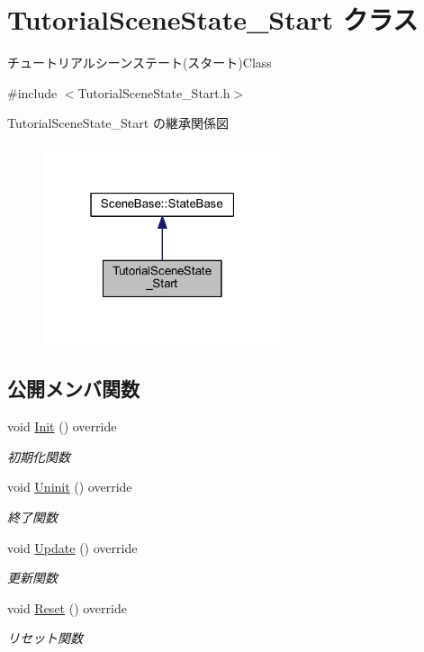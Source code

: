 \hypertarget{class_tutorial_scene_state___start}{}\section{Tutorial\+Scene\+State\+\_\+\+Start クラス}
\label{class_tutorial_scene_state___start}


チュートリアルシーンステート(スタート)Class  




{\ttfamily \#include $<$Tutorial\+Scene\+State\+\_\+\+Start.\+h$>$}



Tutorial\+Scene\+State\+\_\+\+Start の継承関係図\nopagebreak
\begin{figure}[H]
\begin{center}
\leavevmode
\includegraphics[width=199pt]{class_tutorial_scene_state___start__inherit__graph}
\end{center}
\end{figure}
\subsection*{公開メンバ関数}
\begin{DoxyCompactItemize}
\item 
void \mbox{\hyperlink{class_tutorial_scene_state___start_acd4cd7e4efeebffa9616d7ca31c7b1c0}{Init}} () override
\begin{DoxyCompactList}\small\item\em 初期化関数 \end{DoxyCompactList}\item 
void \mbox{\hyperlink{class_tutorial_scene_state___start_a974962addfb0bcba90fbab64ac6d50f0}{Uninit}} () override
\begin{DoxyCompactList}\small\item\em 終了関数 \end{DoxyCompactList}\item 
void \mbox{\hyperlink{class_tutorial_scene_state___start_a93c322692bf56172f383d3e5b17cd85c}{Update}} () override
\begin{DoxyCompactList}\small\item\em 更新関数 \end{DoxyCompactList}\item 
void \mbox{\hyperlink{class_tutorial_scene_state___start_a40bfdf7acd93b619138bf708adff31e4}{Reset}} () override
\begin{DoxyCompactList}\small\item\em リセット関数 \end{DoxyCompactList}\end{DoxyCompactItemize}

